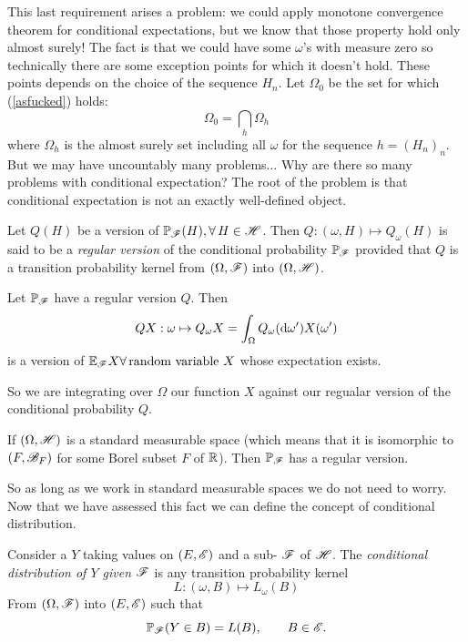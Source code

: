 \documentclass{report}
\begin{document}
This last requirement arises a problem: we could apply monotone convergence theorem for conditional expectations, but we know that those property hold only almost surely!
The fact is that we could have some $\omega$'s with measure zero so technically there are some exception points for which it doesn't hold. These points depends on the choice of the sequence $H_n$. Let $\Omega_0$ be the set for which (\ref{asfucked}) holds:
\[\Omega_0=\bigcap_h\Omega_h\]
where $\Omega_h$ is the almost surely  set including all $\omega$ for the sequence $h={(H_n)}_{n}$. But we may have uncountably many problems... Why are there so many problems with conditional expectation? The root of the problem is that conditional expectation is not an exactly well-defined object.
\begin{definition}
	Let $Q(H)$ be a version of $\mathbb{P}_{\mathscr{F}}(H),\forall\, H\in\mathscr{H}$. Then $Q:(\omega,H)\mapsto Q_\omega(H)$ is said to be a \emph{regular version} of the conditional probability $\mathbb{P}_{\mathscr{F}}$ provided that $Q$ is a transition probability kernel from $(\Omega,\mathscr{F})$ into $(\Omega, \mathscr{H})$.
\end{definition} 
\begin{proposition}
	Let $\mathbb{P}_{\mathscr{F}}$ have a regular version $Q$. Then
	\begin{equation*}
		QX:\omega\mapsto Q_\omega X=\int_\Omega Q_\omega(\mathop{}\!\mathrm{d}\omega')X(\omega')
	\end{equation*}
	is a version of $\mathbb{E}_{\mathscr{F}} X\forall\, \text{random variable{} }X$ whose expectation exists.
\end{proposition}
So we are integrating over $\Omega$ our function $X$ against our regualar version of the conditional probability $Q$.
\begin{theorem}
	If $(\Omega,\mathscr{H})$ is a standard measurable space (which means that it is isomorphic to $(F,\mathscr{B}_F)$ for some Borel subset $F$ of $\mathbb{R}$). Then $\mathbb{P}_{\mathscr{F}}$ has a regular version.
\end{theorem}
So as long as we work in standard measurable spaces we do not need to worry. Now that we have assessed this fact we can define the concept of conditional distribution.
\begin{definition}
	Consider a \rv{} $Y$ taking values on $(E,\mathscr{E})$ and a sub-\sa{} $\mathscr{F}$ of $\mathscr{H}$. The \emph{conditional distribution of $Y$ given $\mathscr{F}$} is any transition probability kernel
	\begin{equation*}
		L:(\omega,B)\mapsto L_{\omega}(B)
	\end{equation*}
	From $(\Omega,\mathscr{F})$ into $(E,\mathscr{E})$ such that
	\begin{equation*}
		\mathbb{P}_{\mathscr{F}}(Y\in B)=L(B),\qquad B\in\mathscr{E}.
	\end{equation*}
 \end{definition}
\end{document}

